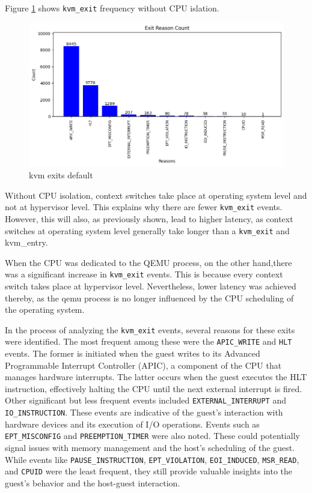 \documentclass[MMR,Master,english]{twbook}
\begin{document}
  Figure \ref{fig:kvm_exits_default} shows \texttt{kvm\_exit} frequency without CPU islation.
  \begin{figure}[H]
    \centering
    \includegraphics[width=1.0\columnwidth]{img/kvm_exits_default.png}
    \caption[kvm exits default]{kvm exits default}
    \label{fig:kvm_exits_default}
  \end{figure}
  \clearpage

\noindent Without CPU isolation, context switches take place at operating system level and not at hypervisor level. This explains why there are fewer \texttt{kvm\_exit} events. However, this will also, as previously shown, lead to higher latency, as context switches at operating system level generally take longer than a \texttt{kvm\_exit} and kvm\_entry.

\noindent When the CPU was dedicated to the QEMU process, on the other hand,there was a significant increase in \texttt{kvm\_exit} events. This is because every context switch takes place at hypervisor level. Nevertheless, lower latency was achieved thereby, as the qemu process is no longer influenced by the CPU scheduling of the operating system.

\noindent In the process of analyzing the \texttt{kvm\_exit} events, several reasons for these exits were identified. The most frequent among these were the \texttt{APIC\_WRITE} and \texttt{HLT} events. The former is initiated when the guest writes to its Advanced Programmable Interrupt Controller (APIC), a component of the CPU that manages hardware interrupts. The latter occurs when the guest executes the HLT instruction, effectively halting the CPU until the next external interrupt is fired. Other significant but less frequent events included \texttt{EXTERNAL\_INTERRUPT} and \texttt{IO\_INSTRUCTION}. These events are indicative of the guest's interaction with hardware devices and its execution of I/O operations. Events such as \texttt{EPT\_MISCONFIG} and \texttt{PREEMPTION\_TIMER} were also noted. These could potentially signal issues with memory management and the host's scheduling of the guest. While events like \texttt{PAUSE\_INSTRUCTION}, \texttt{EPT\_VIOLATION}, \texttt{EOI\_INDUCED}, \texttt{MSR\_READ}, and \texttt{CPUID} were the least frequent, they still provide valuable insights into the guest's behavior and the host-guest interaction. 
\end{document}
